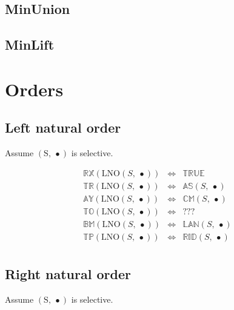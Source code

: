 \documentclass[10pt]{report}
\newcommand{\propname}[1]{{\mathbb{#1}}}
\begin{document}
\subsection{MinUnion} 




\subsection{MinLift} 






\section{Orders}

\subsection{Left natural order}

Assume $\mathrm{(S,\ \bullet)}$ is selective.

\[
\begin{array}{rcl} 
\propname{RX}(\mathrm{LNO}(S,\ \bullet)) 
    & \Leftrightarrow
    & \propname{TRUE}  \\
\propname{TR}(\mathrm{LNO}(S,\ \bullet))
    & \Leftrightarrow
    & \propname{AS}(S,\ \bullet) \\
\propname{AY}(\mathrm{LNO}(S,\ \bullet))
    & \Leftrightarrow
    & \propname{CM}(S,\ \bullet) \\ 
\propname{TO}(\mathrm{LNO}(S,\ \bullet))
    & \Leftrightarrow
    & ??? \\
\propname{BM}(\mathrm{LNO}(S,\ \bullet))
    & \Leftrightarrow
    & \propname{LAN}(S,\ \bullet) \\ 
\propname{TP}(\mathrm{LNO}(S,\ \bullet))
    & \Leftrightarrow
    & \propname{RID}(S,\ \bullet) \\ 
\end{array} 
\] 

\subsection{Right natural order}

Assume $\mathrm{(S,\ \bullet)}$ is selective.
\end{document}
